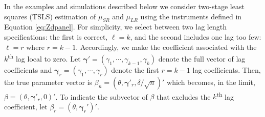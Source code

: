 In the examples and simulations described below we consider two-stage least squares (TSLS) estimation of $\mu_{SR}$ and $\mu_{LR}$ using the instruments defined in Equation \ref{eq:Zdpanel}. 
For simplicity, we select between two lag length specifications: the first is correct, $\ell = k$, and the second includes one lag too few: $\ell = r$ where $r = k-1$.
Accordingly, we make the coefficient associated with the $k$\textsuperscript{th} lag local to zero.
Let $\boldsymbol{\gamma}' = (\gamma_1, \cdots, \gamma_{k-1}, \gamma_{k})$ denote the full vector of lag coefficients and $\boldsymbol{\gamma}_{r} = (\gamma_1, \cdots, \gamma_{r})$ denote the first $r = k-1$ lag coefficients.
Then, the true parameter vector is $\beta_n = (\theta, \boldsymbol{\gamma}'_{r}, \delta/\sqrt{n})'$ which becomes, in the limit, $\beta = (\theta, \boldsymbol{\gamma}'_r, 0)'$.
To indicate the subvector of $\beta$ that excludes the $k$\textsuperscript{th} lag coefficient, let $\beta_{r} = (\theta, \boldsymbol{\gamma}_r')'$.

